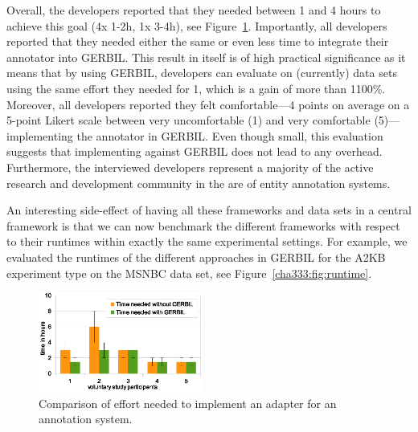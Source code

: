 Overall, the developers reported that they needed between 1 and 4 hours to achieve this goal (4x 1-2h, 1x 3-4h), see Figure~\ref{cha333:fig:comparedTime}.
Importantly, all developers reported that they needed either the same or even less time to integrate their annotator into GERBIL.
This result in itself is of high practical significance as it means that by using GERBIL, developers can evaluate on (currently) \overalldatasets data sets using the same effort they needed for 1, which is a gain of more than 1100\%.
Moreover, all developers reported they felt comfortable---4 points on average on a 5-point Likert scale between very uncomfortable (1) and very comfortable (5)---implementing the annotator in GERBIL.
Even though small, this evaluation suggests that implementing against GERBIL does not lead to any overhead.
Furthermore, the interviewed developers represent a majority of the active research and development community in the are of entity annotation systems.

An interesting side-effect of having all these frameworks and data sets in a central framework is that we can now benchmark the different frameworks with respect to their runtimes within exactly the same experimental settings. 
For example, we evaluated the runtimes of the different approach\-es in GERBIL for the A2KB experiment type on the MSNBC data set, see Figure~\ref{cha333:fig:runtime}.


\begin{figure}[ht]
\centering
\includegraphics[width=0.48\textwidth]{part_02/benchmarking/ESWC_GERBIL_demo/user_study.eps}
\caption{Comparison of effort needed to implement an adapter for an annotation system.}
\label{cha333:fig:comparedTime}
\end{figure}

